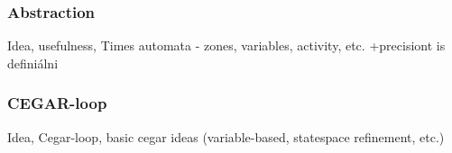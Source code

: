 \subsubsection{Abstraction}
Idea, usefulness, Times automata - zones, variables, activity, etc. +precisiont is definiálni
\subsubsection{CEGAR-loop}
Idea, Cegar-loop, basic cegar ideas (variable-based, statespace refinement, etc.)



